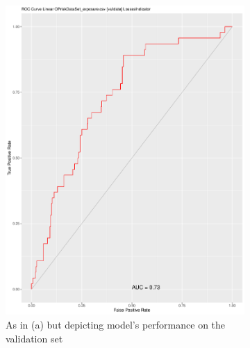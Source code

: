 \documentclass[
]{article}
\begin{document}
\begin{figure}[t!]
\medskip
\begin{subfigure}{0.48\textwidth}
\includegraphics[width=\linewidth]{POI_ROC_Validation.pdf}
\caption{As in (a) but depicting model's performance on the validation set} \label{POI_ROC_Validate}
\end{subfigure}\hspace*{\fill}
\begin{subfigure}{0.48\textwidth}

\end{subfigure}
\end{figure}
\end{document}

